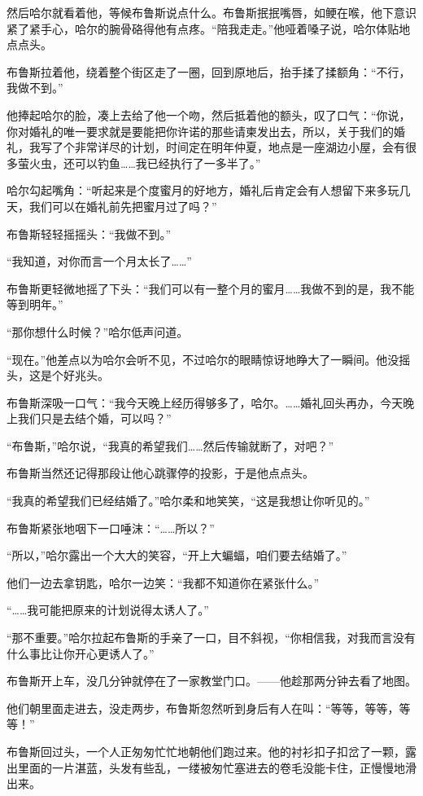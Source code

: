 \documentclass[../main]{subfiles}
\begin{document}
然后哈尔就看着他，等候布鲁斯说点什么。布鲁斯抿抿嘴唇，如鲠在喉，他下意识紧了紧手心，哈尔的腕骨硌得他有点疼。“陪我走走。”他哑着嗓子说，哈尔体贴地点点头。

布鲁斯拉着他，绕着整个街区走了一圈，回到原地后，抬手揉了揉额角：“不行，我做不到。”

他捧起哈尔的脸，凑上去给了他一个吻，然后抵着他的额头，叹了口气：“你说，你对婚礼的唯一要求就是要能把你许诺的那些请柬发出去，所以，关于我们的婚礼，我写了个非常详尽的计划，时间定在明年仲夏，地点是一座湖边小屋，会有很多萤火虫，还可以钓鱼……我已经执行了一多半了。”

哈尔勾起嘴角：“听起来是个度蜜月的好地方，婚礼后肯定会有人想留下来多玩几天，我们可以在婚礼前先把蜜月过了吗？”

布鲁斯轻轻摇摇头：“我做不到。”

“我知道，对你而言一个月太长了\ldots\ldots”

布鲁斯更轻微地摇了下头：“我们可以有一整个月的蜜月……我做不到的是，我不能等到明年。”

“那你想什么时候？”哈尔低声问道。

“现在。”他差点以为哈尔会听不见，不过哈尔的眼睛惊讶地睁大了一瞬间。他没摇头，这是个好兆头。

布鲁斯深吸一口气：“我今天晚上经历得够多了，哈尔。……婚礼回头再办，今天晚上我们只是去结个婚，可以吗？”

“布鲁斯，”哈尔说，“我真的希望我们……然后传输就断了，对吧？”

布鲁斯当然还记得那段让他心跳骤停的投影，于是他点点头。

“我真的希望我们已经结婚了。”哈尔柔和地笑笑，“这是我想让你听见的。”

布鲁斯紧张地咽下一口唾沫：“……所以？”

“所以，”哈尔露出一个大大的笑容，“开上大蝙蝠，咱们要去结婚了。”

他们一边去拿钥匙，哈尔一边笑：“我都不知道你在紧张什么。”

“……我可能把原来的计划说得太诱人了。”

“那不重要。”哈尔拉起布鲁斯的手亲了一口，目不斜视，“你相信我，对我而言没有什么事比让你开心更诱人了。”

布鲁斯开上车，没几分钟就停在了一家教堂门口。——他趁那两分钟去看了地图。

他们朝里面走进去，没走两步，布鲁斯忽然听到身后有人在叫：“等等，等等，等等！”

布鲁斯回过头，一个人正匆匆忙忙地朝他们跑过来。他的衬衫扣子扣岔了一颗，露出里面的一片湛蓝，头发有些乱，一缕被匆忙塞进去的卷毛没能卡住，正慢慢地滑出来。
\end{document}
